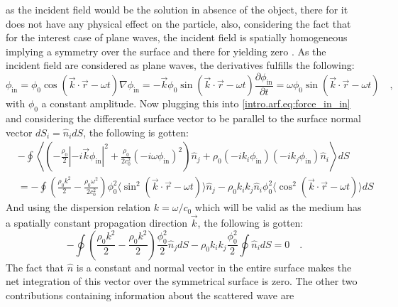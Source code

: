 as the incident field would be the solution in absence of the object, there for it does not have any physical effect on the particle, also, considering the fact that for the interest case of plane waves, the incident field is spatially homogeneous implying a symmetry over the surface and there for yielding zero \cite[~p.79]{Manneberg2009}\cite[~p.]{Bruus2012_07}. As the incident field are considered as plane waves, the derivatives fulfills the following:
\begin{subequations}
\begin{equation}
    \phi_{\text{in}} = \phi_0 \cos(\vec k\cdot \vec r - \omega t)
\end{equation}
\begin{equation}
    \nabla\phi_{\text{in}} = -\vec k \phi_0 \sin(\vec k\cdot \vec r - \omega t)
\end{equation}
\begin{equation}
    \frac{\partial\phi_{\text{in}}}{\partial t} = \omega \phi_0 \sin(\vec k\cdot \vec r - \omega t) \quad,
\end{equation}
\end{subequations}
with $\phi_0$ a constant amplitude. Now plugging this into \ref{intro.arf.eq:force_in_in} and considering the differential surface vector to be parallel to the surface normal vector $dS_i = \hat n_i dS$, the following is gotten:
\begin{align}
    &-\oint\left\langle\left(-\frac{\rho_0}{2}|-i\vec k\phi_{\text{in}}|^2 + \frac{\rho_0}{2c_0^2}(-i\omega\phi_{\text{in}})^2\right)\hat n_{j} + \rho_0(-i k_i\phi_{\text{in}})(-ik_j\phi_{\text{in}})\hat n_{i}\right\rangle dS\nonumber\\
    &=-\oint\left(\frac{\rho_0 k^2}{2} - \frac{\rho_0\omega^2}{2c_0^2}\right)\phi_0^2\langle\sin^2(\vec k\cdot \vec r - \omega t)\rangle\hat n_{j} - \rho_0 k_ik_j\hat n_{i}\phi_0^2\langle\cos^2(\vec k\cdot \vec r - \omega t)\rangle dS \label{intro.arf.eq:force_in_in_plane_wave}
\end{align}
And using the dispersion relation $k = \omega / c_0$ which will be valid as the medium has a spatially constant propagation direction $\vec k$, the following is gotten:
\begin{equation}\label{intro.arf.eq:force_in_in_zero}
    -\oint\left(\frac{\rho_0 k^2}{2} - \frac{\rho_0 k^2}{2}\right)\frac{\phi_0^2}{2}\hat n_{j} dS -\rho_0 k_ik_j\frac{\phi_0^2}{2}\oint\hat n_{i} dS = 0\quad.
\end{equation}
The fact that $\hat n$ is a constant and normal vector in the entire surface makes the net integration of this vector over the symmetrical surface is zero. The other two contributions containing information about the scattered wave are
